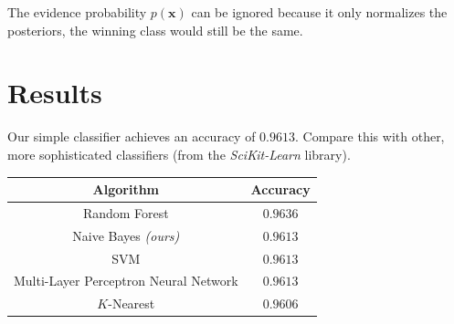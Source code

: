 \documentclass[14pt]{extarticle}
\begin{document}
    The evidence probability $p(\boldsymbol{x})$ can be ignored because it only
    normalizes the posteriors, the winning class would still be the same.

    \section{Results}
    Our simple classifier achieves an accuracy of $0.9613$. Compare this with
    other, more sophisticated classifiers (from the \emph{SciKit-Learn}
    library).

    \begin{center}
    \begin{tabular}{cc}
        Algorithm & Accuracy \\
        \midrule
        Random Forest & $0.9636$ \\
        Naive Bayes \textit{(ours)} & $0.9613$ \\
        SVM & $0.9613$ \\
        Multi-Layer Perceptron Neural Network & $0.9613$ \\
        $K$-Nearest & $0.9606$
    \end{tabular}
    \end{center}
\end{document}
